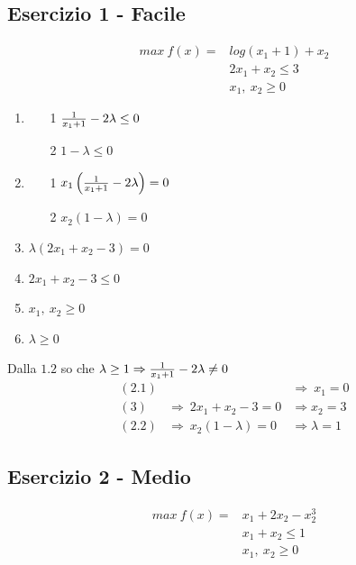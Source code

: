 \documentclass[12pt,a4paper]{article}
\begin{document}
\subsection{Esercizio 1 - Facile}
\begin{equation*}
\begin{array}{rl}
max \ f(x) = & log(x_1+1)+x_2\\
& 2x_1+x_2 \leq 3\\
& x_1,\ x_2 \geq 0
\end{array}
\end{equation*}

\begin{enumerate}
\item \begin{enumerate}
\item[1] ${1 \over x_1 +1} - 2\lambda \leq 0$
\item[2] $1-\lambda \leq 0$\end{enumerate}
\item \begin{enumerate}
\item[1] $x_1 \left({1 \over x_1 +1} - 2\lambda\right) = 0$
\item[2] $x_2(1-\lambda)=0$
\end{enumerate}
\item $\lambda(2x_1+x_2-3) = 0$
\item $2x_1+x_2 - 3 \leq 0$
\item $x_1,\ x_2 \geq 0$
\item $\lambda \geq 0$
\end{enumerate}

\SmallSep \noindent
Dalla $1.2$ so che $\lambda \geq 1 \Rightarrow {1 \over x_1 +1} - 2\lambda \not = 0 $ 
$$\begin{array}{rll}
 (2.1) & & \Rightarrow\ x_1 = 0\\
 (3) & \Rightarrow\ 2x_1+x_2-3 = 0 & \Rightarrow x_2 = 3\\
 (2.2) & \Rightarrow\ x_2(1-\lambda)=0 & \Rightarrow \lambda= 1
\end{array}$$

\subsection{Esercizio 2 - Medio}
\begin{equation*}
\begin{array}{rl}
max \ f(x) = & x_1+2x_2-x_2^3\\
& x_1+x_2 \leq 1\\
& x_1,\ x_2 \geq 0
\end{array}
\end{equation*}
\end{document}
